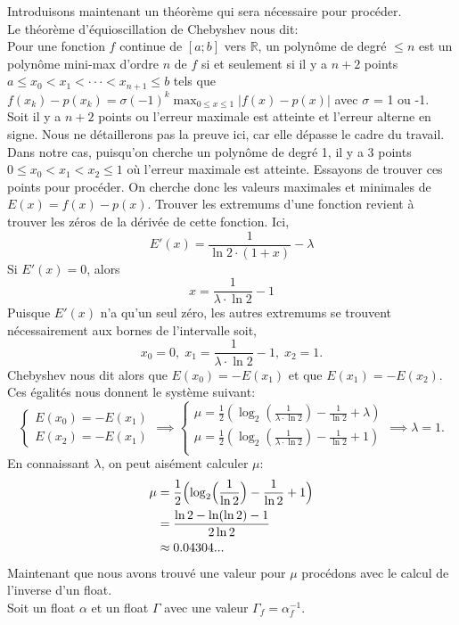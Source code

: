 \documentclass{article}
\begin{document}
Introduisons maintenant un théorème qui sera nécessaire pour procéder.\\
Le théorème d'équioscillation de Chebyshev nous dit:\\
Pour une fonction $f$ continue de $[a;b]$ vers $\mathbb{R}$, un polynôme de degré $\le n$ est un polynôme mini-max d'ordre $n$ de $f$ si et seulement si il y a $n+2$ points $a\le x_0< x_1<\cdot\cdot\cdot<x_{n+1}\le b$ tels que $f(x_k)-p(x_k) = \sigma(-1)^k \max_{0\le x\le1}|f(x)-p(x)|$ avec $\sigma$ = 1 ou -1.\\
Soit il y a $n+2$ points ou l'erreur maximale est atteinte et l'erreur alterne en signe.
Nous ne détaillerons pas la preuve ici, car elle dépasse le cadre du travail.
Dans notre cas, puisqu'on cherche un polynôme de degré 1, il y a 3 points $0\le x_0<x_1<x_2\le1$ où l'erreur maximale est atteinte. Essayons de trouver ces points pour procéder. On cherche donc les valeurs maximales et minimales de $E(x) = f(x)-p(x)$. Trouver les extremums d'une fonction revient à trouver les zéros de la dérivée de cette fonction. Ici,
$$
E'(x) = \frac{1}{\ln2\cdot(1+x)} - \lambda
$$
Si $E'(x) = 0$, alors
$$
x = \frac{1}{\lambda\cdot\ln2}-1
$$
Puisque $E'(x)$ n'a qu'un seul zéro, les autres extremums se trouvent nécessairement aux bornes de l'intervalle soit, $$
x_0 = 0,\; x_1 = \frac{1}{\lambda\cdot\ln2}-1,\;x_2 = 1.
$$
Chebyshev nous dit alors que $E(x_0) = -E(x_1)$ et que $E(x_1) = -E(x_2)$.
Ces égalités nous donnent le système suivant:
$$
\begin{cases}
E(x_0) = -E(x_1)\\
E(x_2) = -E(x_1)
\end{cases}
\implies
\begin{cases}
\mu = \frac{1}{2}(\log_2(\frac{1}{\lambda\cdot\ln2})-\frac{1}{\ln2}+\lambda)\\
\mu = \frac{1}{2}(\log_2(\frac{1}{\lambda\cdot\ln2})-\frac{1}{\ln2}+1)\\
\end{cases}
\implies \lambda = 1.
$$
En connaissant $\lambda$, on peut aisément calculer $\mu$:
\begin{align*}
\mu &= \frac{1}{2}\Bigl(\log_2\Bigl(\frac{1}{\ln2}\Bigr)-\frac{1}{\ln2}+1\Bigr)\\
&= \frac{\ln2-\ln(\ln2)-1}{2\ln2}\\
&\approx 0.04304...
\end{align*}
Maintenant que nous avons trouvé une valeur pour $\mu$ procédons avec le calcul de l'inverse d'un float.
\\
Soit un float $\alpha$ et un float $\Gamma$ avec une valeur $\Gamma_f = \alpha_f^{-1}$.\\
\end{document}
